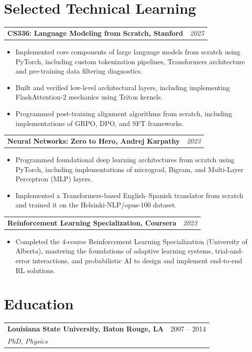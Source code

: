 \documentclass[10pt,letterpaper]{article}
\makeatletter
\newcommand{\heading}[2]{\vspace{2pt}\begin{tabularx}{\textwidth}{@{}Xr@{}}\textbf{#1} & \textit{#2}\end{tabularx}\vspace{-0pt}}
\newcommand{\headingwtitle}[3]{\vspace{2pt}\begin{tabularx}{\textwidth}{@{}Xr@{}}\textbf{#1} & #3\\[1pt] \textit{#2} & \end{tabularx}\vspace{-0pt}}
\makeatother
\begin{document}
\section*{Selected Technical Learning}
\heading{CS336: Language Modeling from Scratch, Stanford}{2025}
\begin{itemize}
\item Implemented core components of large language models from scratch using PyTorch, including custom tokenization pipelines, Transformers architecture and pre-training data filtering diagnostics.
\item Built and verified low-level architectural layers, including implementing FlashAttention-2 mechanics using Triton kernels.
\item Programmed post-training alignment algorithms from scratch, including implementations of GRPO, DPO, and SFT frameworks.
\end{itemize}

\heading{Neural Networks: Zero to Hero, Andrej Karpathy}{2023}
\begin{itemize}
\item Programmed foundational deep learning architectures from scratch using PyTorch, including implementations of micrograd, Bigram, and Multi-Layer Perceptron (MLP) layers.
\item Implemented a Transformers-based English--Spanish translator from scratch and trained it on the Helsinki-NLP/opus-100 dataset.
\end{itemize}

\heading{Reinforcement Learning Specialization, Coursera}{2023}
\begin{itemize}
\item Completed the 4-course Reinforcement Learning Specialization (University of Alberta), mastering the foundations of adaptive learning systems, trial-and-error interactions, and probabilistic AI to design and implement end-to-end RL solutions.
\end{itemize}

\section*{Education}
\headingwtitle{Louisiana State University, Baton Rouge, LA}{PhD, Physics}{2007 -- 2014}
\end{document}
